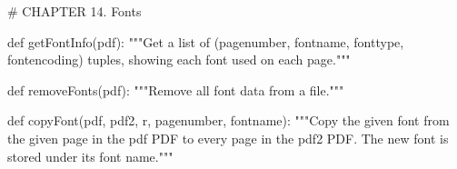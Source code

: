 # CHAPTER 14. Fonts

def getFontInfo(pdf):
    """Get a list of (pagenumber, fontname, fonttype, fontencoding) tuples,
    showing each font used on each page."""

def removeFonts(pdf):
    """Remove all font data from a file."""

def copyFont(pdf, pdf2, r, pagenumber, fontname):
    """Copy the given font from the given page in the pdf PDF to every page in
    the pdf2 PDF. The new font is stored under its font name."""
